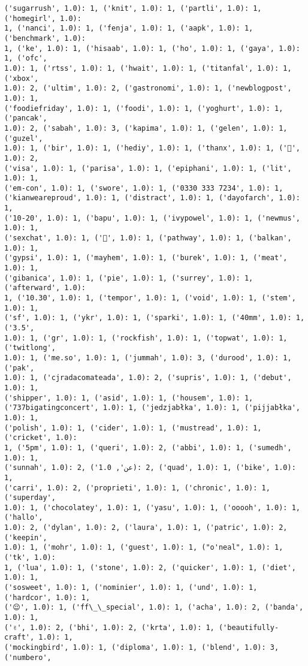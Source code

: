 \documentclass[11pt]{article}
\begin{document}
\begin{Verbatim}[commandchars=\\\{\}]
('sugarrush', 1.0): 1, ('knit', 1.0): 1, ('partli', 1.0): 1, ('homegirl', 1.0):
1, ('nanci', 1.0): 1, ('fenja', 1.0): 1, ('aapk', 1.0): 1, ('benchmark', 1.0):
1, ('ke', 1.0): 1, ('hisaab', 1.0): 1, ('ho', 1.0): 1, ('gaya', 1.0): 1, ('ofc',
1.0): 1, ('rtss', 1.0): 1, ('hwait', 1.0): 1, ('titanfal', 1.0): 1, ('xbox',
1.0): 2, ('ultim', 1.0): 2, ('gastronomi', 1.0): 1, ('newblogpost', 1.0): 1,
('foodiefriday', 1.0): 1, ('foodi', 1.0): 1, ('yoghurt', 1.0): 1, ('pancak',
1.0): 2, ('sabah', 1.0): 3, ('kapima', 1.0): 1, ('gelen', 1.0): 1, ('guzel',
1.0): 1, ('bir', 1.0): 1, ('hediy', 1.0): 1, ('thanx', 1.0): 1, ('💞', 1.0): 2,
('visa', 1.0): 1, ('parisa', 1.0): 1, ('epiphani', 1.0): 1, ('lit', 1.0): 1,
('em-con', 1.0): 1, ('swore', 1.0): 1, ('0330 333 7234', 1.0): 1,
('kianweareproud', 1.0): 1, ('distract', 1.0): 1, ('dayofarch', 1.0): 1,
('10-20', 1.0): 1, ('bapu', 1.0): 1, ('ivypowel', 1.0): 1, ('newmus', 1.0): 1,
('sexchat', 1.0): 1, ('🍅', 1.0): 1, ('pathway', 1.0): 1, ('balkan', 1.0): 1,
('gypsi', 1.0): 1, ('mayhem', 1.0): 1, ('burek', 1.0): 1, ('meat', 1.0): 1,
('gibanica', 1.0): 1, ('pie', 1.0): 1, ('surrey', 1.0): 1, ('afterward', 1.0):
1, ('10.30', 1.0): 1, ('tempor', 1.0): 1, ('void', 1.0): 1, ('stem', 1.0): 1,
('sf', 1.0): 1, ('ykr', 1.0): 1, ('sparki', 1.0): 1, ('40mm', 1.0): 1, ('3.5',
1.0): 1, ('gr', 1.0): 1, ('rockfish', 1.0): 1, ('topwat', 1.0): 1, ('twitlong',
1.0): 1, ('me.so', 1.0): 1, ('jummah', 1.0): 3, ('durood', 1.0): 1, ('pak',
1.0): 1, ('cjradacomateada', 1.0): 2, ('supris', 1.0): 1, ('debut', 1.0): 1,
('shipper', 1.0): 1, ('asid', 1.0): 1, ('housem', 1.0): 1,
('737bigatingconcert', 1.0): 1, ('jedzjabłka', 1.0): 1, ('pijjabłka', 1.0): 1,
('polish', 1.0): 1, ('cider', 1.0): 1, ('mustread', 1.0): 1, ('cricket', 1.0):
1, ('5pm', 1.0): 1, ('queri', 1.0): 2, ('abbi', 1.0): 1, ('sumedh', 1.0): 1,
('sunnah', 1.0): 2, ('عن', 1.0): 2, ('quad', 1.0): 1, ('bike', 1.0): 1,
('carri', 1.0): 2, ('proprieti', 1.0): 1, ('chronic', 1.0): 1, ('superday',
1.0): 1, ('chocolatey', 1.0): 1, ('yasu', 1.0): 1, ('ooooh', 1.0): 1, ('hallo',
1.0): 2, ('dylan', 1.0): 2, ('laura', 1.0): 1, ('patric', 1.0): 2, ('keepin',
1.0): 1, ('mohr', 1.0): 1, ('guest', 1.0): 1, ("o'neal", 1.0): 1, ('tk', 1.0):
1, ('lua', 1.0): 1, ('stone', 1.0): 2, ('quicker', 1.0): 1, ('diet', 1.0): 1,
('sosweet', 1.0): 1, ('nominier', 1.0): 1, ('und', 1.0): 1, ('hardcor', 1.0): 1,
('😌', 1.0): 1, ('ff\_\_special', 1.0): 1, ('acha', 1.0): 2, ('banda', 1.0): 1,
('✌', 1.0): 2, ('bhi', 1.0): 2, ('krta', 1.0): 1, ('beautifully-craft', 1.0): 1,
('mockingbird', 1.0): 1, ('diploma', 1.0): 1, ('blend', 1.0): 3, ('numbero',

\end{Verbatim}
\end{document}
